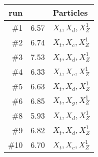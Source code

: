 \begin{tabular}{r|r|l}
run & \K & Particles \\
\hline
\#1 & 6.57 & $X_{t}, X_{d}, X_{Z}^{1}$ \\
\#2 & 6.74 & $X_{t}, X_{c}, X_{Z}^{1}$ \\
\#3 & 7.53 & $X_{t}, X_{d}, X_{Z}^{1}$ \\
\#4 & 6.33 & $X_{t}, X_{c}, X_{Z}^{1}$ \\
\#5 & 6.63 & $X_{t}, X_{d}, X_{Z}^{1}$ \\
\#6 & 6.85 & $X_{t}, X_{g}, X_{Z}^{1}$ \\
\#8 & 5.93 & $X_{t}, X_{d}, X_{Z}^{1}$ \\
\#9 & 6.82 & $X_{t}, X_{d}, X_{Z}^{1}$ \\
\#10 & 6.70 & $X_{t}, X_{c}, X_{Z}^{1}$ \\
\end{tabular}

